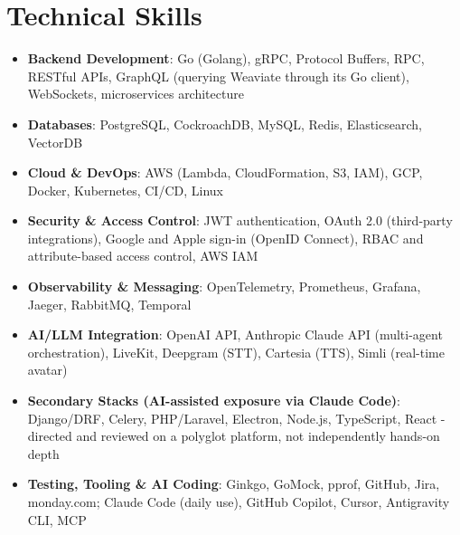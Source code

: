 \documentclass[11pt,a4paper,sans]{moderncv}
\begin{document}
\section{Technical Skills}
\vspace{1pt}
\begin{itemize}

\item \textbf{Backend Development}: Go (Golang), gRPC, Protocol Buffers, RPC, RESTful APIs, GraphQL (querying Weaviate through its Go client), WebSockets, microservices architecture

\item \textbf{Databases}: PostgreSQL, CockroachDB, MySQL, Redis, Elasticsearch, VectorDB

\item \textbf{Cloud \& DevOps}: AWS (Lambda, CloudFormation, S3, IAM), GCP, Docker, Kubernetes, CI/CD, Linux

\item \textbf{Security \& Access Control}: JWT authentication, OAuth 2.0 (third-party integrations), Google and Apple sign-in (OpenID Connect), RBAC and attribute-based access control, AWS IAM

\item \textbf{Observability \& Messaging}: OpenTelemetry, Prometheus, Grafana, Jaeger, RabbitMQ, Temporal

\item \textbf{AI/LLM Integration}: OpenAI API, Anthropic Claude API (multi-agent orchestration), LiveKit, Deepgram (STT), Cartesia (TTS), Simli (real-time avatar)

\item \textbf{Secondary Stacks (AI-assisted exposure via Claude Code)}: Django/DRF, Celery, PHP/Laravel, Electron, Node.js, TypeScript, React - directed and reviewed on a polyglot platform, not independently hands-on depth

\item \textbf{Testing, Tooling \& AI Coding}: Ginkgo, GoMock, pprof, GitHub, Jira, monday.com; Claude Code (daily use), GitHub Copilot, Cursor, Antigravity CLI, MCP

\end{itemize}

\end{document}
